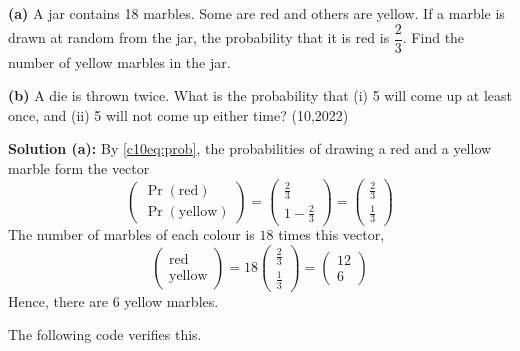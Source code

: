 \clearpage
\item \textbf{(a)} A jar contains 18 marbles. Some are red and others are yellow. If a marble is drawn at random from the jar, the probability that it is red is $\dfrac{2}{3}$. Find the number of yellow marbles in the jar.

\textbf{(b)} A die is thrown twice. What is the probability that (i) 5 will come up at least once, and (ii) 5 will not come up either time? \hfill (10,2022)

\textbf{Solution (a):} By \eqref{c10eq:prob}, the probabilities of drawing a red and a yellow marble form the vector
\begin{equation}
\begin{pmatrix} \Pr(\text{red}) \\ \Pr(\text{yellow}) \end{pmatrix} = \begin{pmatrix} \frac{2}{3} \\ 1 - \frac{2}{3} \end{pmatrix} = \begin{pmatrix} \frac{2}{3} \\ \frac{1}{3} \end{pmatrix}
\end{equation}
The number of marbles of each colour is $18$ times this vector,
\begin{equation}
\begin{pmatrix} \text{red} \\ \text{yellow} \end{pmatrix} = 18\begin{pmatrix} \frac{2}{3} \\ \frac{1}{3} \end{pmatrix} = \begin{pmatrix} 12 \\ 6 \end{pmatrix}
\end{equation}
Hence, there are $6$ yellow marbles.

The following code verifies this.

\nopagebreak[4]
\begin{center}
\end{center}

